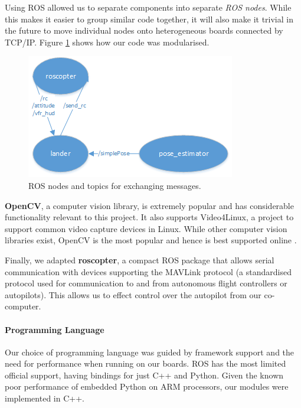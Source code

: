 \documentclass{acm_proc_article-sp}
\begin{document}
Using ROS allowed us to separate components into separate \textit{ROS nodes}. While this makes it easier to group similar code together, it will also make it trivial in the future to move individual nodes onto heterogeneous boards connected by TCP/IP. Figure \ref{fig:rosnodes} shows how our code was modularised. 

\begin{figure}[h]
  \centering
  \includegraphics[width=.7\linewidth]{images/rosnodes.png}
  \caption{ROS nodes and topics for exchanging messages.}
  \label{fig:rosnodes}
\end{figure}

\textbf{OpenCV}, a computer vision library, is extremely popular and has considerable functionality relevant to this project. It also supports Video4Linux, a project to support common video capture devices in Linux. While other computer vision libraries exist, OpenCV is the most popular and hence is best supported online \cite{bestlibraryforcomputervision}.

Finally, we adapted \textbf{roscopter}, a compact ROS package that allows serial communication with devices supporting the MAVLink protocol (a standardised protocol used for communication to and from autonomous flight controllers or autopilots). This allows us to effect control over the autopilot from our co-computer.

\paragraph{Programming Language}
Our choice of programming language was guided by framework support and the need for performance when running on our boards. ROS has the most limited official support, having bindings for just C++ and Python. Given the known poor performance of embedded Python on ARM processors, our modules were implemented in C++.
\end{document}
